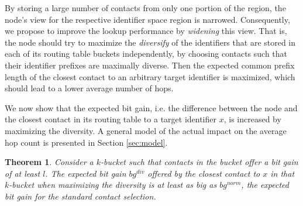 \documentclass[10pt, conference, compsocconf, letterpaper]{IEEEtran}
\newtheorem{theorem}{Theorem}
\begin{document}
By storing a large number of contacts from only one portion of the region, the node's view for the respective identifier space region is  narrowed.
Consequently, we propose to improve the lookup performance by \emph{widening} this view. That is, the node should try to maximize the \emph{diversify} of the identifiers that are stored in each of its routing table buckets independently, 
by choosing contacts such that their identifier prefixes are maximally diverse. Then the expected common prefix length of the closest contact to an arbitrary target identifier is maximized, which should lead to a lower average number of hops.

We now show that the expected bit gain, i.e. the difference between the node and
the closest contact in its routing table to a target identifier $x$, is increased by maximizing the diversity. A general model of the actual impact on the average hop count is presented in Section \ref{sec:model}.
\begin{theorem}
 \label{thm:bitgain}
Consider a $k$-bucket such that contacts in the bucket offer a bit gain of at least $l$. 
 The expected
bit gain $bg^{div}$ offered by the closest contact to $x$ in that $k$-bucket when maximizing
the diversity  is at least as big as $bg^{norm}$, the expected bit gain for the standard contact selection.\end{theorem}  
\end{document}
